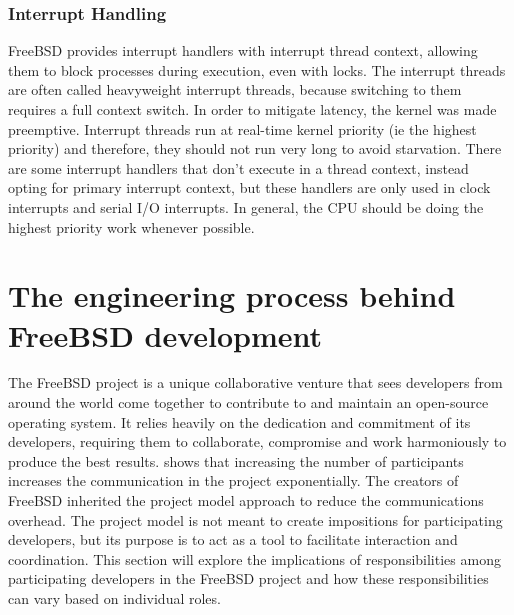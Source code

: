 \documentclass[12pt, dvipsnames, a4paper]{article}
\begin{document}
\subsubsection{Interrupt Handling}

FreeBSD provides interrupt handlers with interrupt thread context, allowing them to block processes during execution, even with locks. The interrupt threads are often called heavyweight interrupt threads, because switching to them requires a full context switch. In order to mitigate latency, the kernel was made preemptive. Interrupt threads run at real-time kernel priority (ie the highest priority) and therefore, they should not run very long to avoid starvation. There are some interrupt handlers that don’t execute in a thread context, instead opting for primary interrupt context, but these handlers are only used in clock interrupts and serial I/O interrupts. In general, the CPU should be doing the highest priority work whenever possible.

\section{ The engineering process behind FreeBSD development }

The FreeBSD project is a unique collaborative venture that sees developers from around the world come together to contribute to and maintain an open-source operating system. It relies heavily on the dedication and commitment of its developers, requiring them to collaborate, compromise and work harmoniously to produce the best results. \cite{brooks} shows that increasing the number of participants increases the communication in the project exponentially. The creators of FreeBSD inherited the project model \cite{dev-model} approach to reduce the communications overhead. The project model is not meant to create impositions for participating developers, but its purpose is to act as a tool to facilitate interaction and coordination. This section will explore the implications of responsibilities among participating developers in the FreeBSD project and how these responsibilities can vary based on individual roles.
\end{document}
